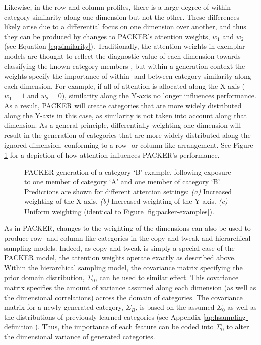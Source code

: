 \documentclass[12pt]{article}
\newcommand\inputpgf[2]{{
\let\pgfimageWithoutPath\pgfimage
\renewcommand{\pgfimage}[2][]{\pgfimageWithoutPath[##1]{#1/##2}}

}}
\begin{document}
\begin{flushleft}
Likewise, in the row and column profiles, there is a large degree of within-category similarity along one dimension but not the other. These differences likely arise due to a differential focus on one dimension over another, and thus they can be produced by changes to PACKER's attention weights, $w_1$ and $w_2$ (see Equation \ref{eq:similarity}). Traditionally, the attention weights in exemplar models are thought to reflect the diagnostic value of each dimension towards classifying the known category members \citep{nosofsky1984choice,nosofsky1986attention,kruschke1992alcove}, but within a generation context the weights specify the importance of within- and between-category similarity along each dimension. For example, if all of attention is allocated along the X-axis ($w_1=1$ and $w_2=0$), similarity along the Y-axis no longer influences performance. As a result, PACKER will create categories that are more widely distributed along the Y-axis in this case, as similarity is not taken into account along that dimension. As a general principle, differentially weighting one dimension will result in the generation of categories that are more widely distributed along the ignored dimension, conforming to a row- or column-like arrangement. See Figure \ref{fig:packer-attention} for a depiction of how attention influences PACKER's performance. 

\begin{figure}
    \begin{center}
    \inputpgf{figs/}{packer-attention-examples.pgf}
    \caption{PACKER generation of a category `B' example, following exposure to one member of category `A' and one member of category `B'. Predictions are shown for different attention settings: {\em (a)} Increased weighting of the X-axis. {\em (b)} Increased weighting of the Y-axis. {\em (c)} Uniform weighting (identical to Figure \ref{fig:packer-examples}).}
    \label{fig:packer-attention}
    \end{center}
\end{figure}

As in PACKER, changes to the weighting of the dimensions can also be used to produce row- and column-like categories in the copy-and-tweak and hierarchical sampling models. Indeed, as copy-and-tweak is simply a special case of the PACKER model, the attention weights operate exactly as described above. Within the hierarchical sampling model, the covariance matrix specifying the prior domain distribution, $\Sigma_0$, can be used to similar effect. This covariance matrix specifies the amount of variance assumed along each dimension (as well as the dimensional correlations) across the domain of categories. The covariance matrix for a newly generated category, $\Sigma_B$, is based on the assumed $\Sigma_0$ as well as the distributions of previously learned categories (see Appendix \ref{ap:hsampling-definition}). Thus, the importance of each feature can be coded into $\Sigma_0$ to alter the dimensional variance of generated categories.


\end{flushleft}
\end{document}
